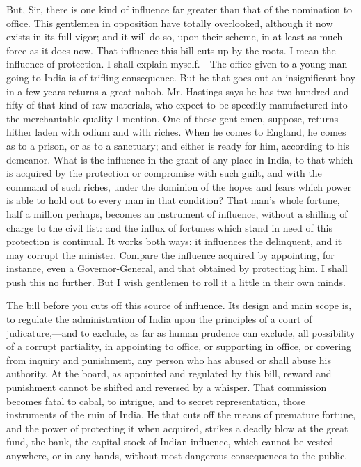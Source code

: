 But, Sir, there is one kind of influence far greater than that of the nomination to office. This gentlemen in opposition have totally overlooked, although it now exists in its full vigor; and it will do so, upon their scheme, in at least as much force as it does now. That influence this bill cuts up by the roots. I mean the influence of protection. I shall explain myself.—The office given to a young man going to India is of trifling consequence. But he that goes out an insignificant boy in a few years returns a great nabob. Mr. Hastings says he has two hundred and fifty of that kind of raw materials, who expect to be speedily manufactured into the merchantable quality I mention. One of these gentlemen, suppose, returns hither laden with odium and with riches. When he comes to England, he comes as to a prison, or as to a sanctuary; and either is ready for him, according to his demeanor. What is the influence in the grant of any place in India, to that which is acquired by the protection or compromise with such guilt, and with the command of such riches, under the dominion of the hopes and fears which power is able to hold out to every man in that condition? That man's whole fortune, half a million perhaps, becomes an instrument of influence, without a shilling of charge to the civil list: and the influx of fortunes which stand in need of this protection is continual. It works both ways: it influences the delinquent, and it may corrupt the minister. Compare the influence acquired by appointing, for instance, even a Governor-General, and that obtained by protecting him. I shall push this no further. But I wish gentlemen to roll it a little in their own minds.

The bill before you cuts off this source of influence. Its design and main scope is, to regulate the administration of India upon the principles of a court of judicature,—and to exclude, as far as human prudence can exclude, all possibility of a corrupt partiality, in appointing to office, or supporting in office, or covering from inquiry and punishment, any person who has abused or shall abuse his authority. At the board, as appointed and regulated by this bill, reward and punishment cannot be shifted and reversed by a whisper. That commission becomes fatal to cabal, to intrigue, and to secret representation, those instruments of the ruin of India. He that cuts off the means of premature fortune, and the power of protecting it when acquired, strikes a deadly blow at the great fund, the bank, the capital stock of Indian influence, which cannot be vested anywhere, or in any hands, without most dangerous consequences to the public.

